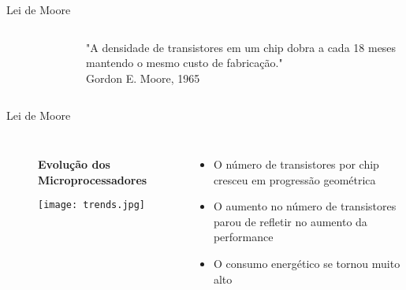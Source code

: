 \begin{frame}[t]{Lei de Moore}
        \begin{columns}
                \begin{figure}
                \end{figure}
            \LARGE
            "A densidade de transistores em um chip dobra a cada 18 meses mantendo o mesmo custo de fabricação."\\
            Gordon E. Moore, 1965
        \end{columns}
\end{frame}
\begin{frame}[t]{Lei de Moore}
    \begin{columns}
        \begin{figure}
            \centering
            \textbf{Evolução dos Microprocessadores}\par\medskip
            \texttt{[image: trends.jpg]}
        \end{figure}
        \large{
        \begin{itemize}
            \item O número de transistores por chip cresceu em progressão geométrica\\
            \item O aumento no número de transistores parou de refletir no aumento da performance\\
            \item O consumo energético se tornou muito alto
        \end{itemize}
        }
    \end{columns}
    
\end{frame}
